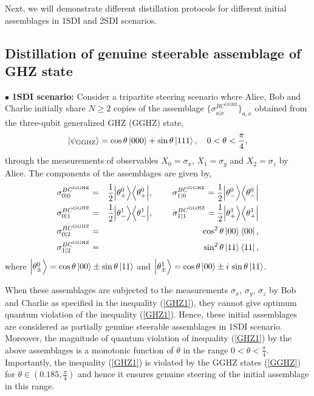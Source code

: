 \documentclass[reprint,superscriptaddress,nofootinbib,amsmath,amssymb,aps,pra,longbibliography]{revtex4-1}
\begin{document}
Next, we will demonstrate different distillation protocols for different initial assemblages in 1SDI and 2SDI scenarios.

\subsection{Distillation of genuine steerable assemblage of GHZ state}\label{subsection1}

$\bullet$ {\bf 1SDI scenario:} Consider a tripartite steering scenario where Alice, Bob and Charlie initially  share  $N \geq 2$ copies of the assemblage $\{\sigma_{a|x}^{BC^{\text{GGHZ}}}\}_{a,x}$ obtained from the three-qubit generalized GHZ (GGHZ) state,
\begin{equation}
	|\psi_{\text{GGHZ}} \rangle = \cos \theta \ket{000} + \sin \theta \ket{111}, \quad 0 < \theta < \frac{\pi}{4},
	\label{GGHZ}
\end{equation}
through the measurements of observables $X_0= \sigma_x$, $X_1=\sigma_y$ and $X_2= \sigma_z$ by Alice. The components of the assemblages are given by,
\begin{eqnarray}
	\sigma_{0|0}^{BC^{\text{GGHZ}}} &=& \frac{1}{2} \Big| \theta_+^0 \Big\rangle \Big\langle \theta_+^0 \Big|,\quad \hspace{0.45cm} \sigma_{1|0}^{BC^{\text{GGHZ}}} = \frac{1}{2} \Big| \theta_-^0 \Big\rangle \Big\langle \theta_-^0 \Big| \nonumber \\ 
    \sigma_{0|1}^{BC^{\text{GGHZ}}} &=& \frac{1}{2} \Big| \theta_-^1 \Big\rangle \Big\langle \theta_-^1 \Big|,\quad \hspace{0.45cm} \sigma_{1|1}^{BC^{\text{GGHZ}}} = \frac{1}{2} \Big| \theta_+^1 \Big\rangle \Big\langle \theta_+^1 \Big| \nonumber \\ 
	\sigma_{0|2}^{BC^{\text{GGHZ}}} &=& \cos^2\theta \ket{00}\bra{00},\nonumber \\
	\sigma_{1|2}^{BC^{\text{GGHZ}}} &=& \sin^2\theta \ket{11}\bra{11},
	\label{GGHZassemblage}
\end{eqnarray}
where $\Big| \theta_\pm^0 \Big\rangle = \cos\theta \ket{00} \pm \sin\theta \ket{11}$ and $\Big| \theta_\pm^1 \Big\rangle = \cos\theta \ket{00} \pm i \, \sin\theta \ket{11}$. 

When these assemblages are subjected to the measurements  $\sigma_x$,  $\sigma_y$,  $\sigma_z$ by Bob and  Charlie as specified in the inequality (\ref{GHZ1}), they cannot give optimum quantum violation of the inequality (\ref{GHZ1}). Hence,  these initial assemblages are considered as partially genuine steerable assemblages in 1SDI scenario. Moreover, the magnitude of quantum violation of inequality (\ref{GHZ1}) by the above assemblages is a monotonic function of $\theta$ in the range $0 < \theta < \frac{\pi}{4}$.
Importantly, the inequality (\ref{GHZ1}) is violated by the GGHZ states (\ref{GGHZ}) for $\theta \in ( 0.185, \frac{\pi}{4})$ and hence it ensures genuine steering of the initial assemblage in this range.
\end{document}
